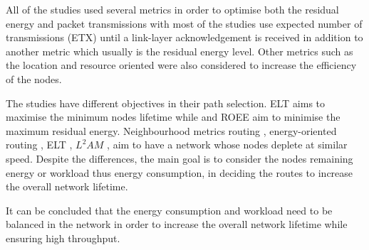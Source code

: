 All of the studies used several metrics in order to optimise both the residual energy and packet transmissions with most of the studies use expected number of transmissions (ETX) until a link-layer acknowledgement is received in addition to another metric which usually is the residual energy level. Other metrics such as the location and resource oriented were also considered to increase the efficiency of the nodes.

The studies have different objectives in their path selection.
ELT \cite{elt} aims to maximise the minimum nodes lifetime while \cite{energyrpl} and ROEE \cite{roee} aim to minimise the maximum residual energy. Neighbourhood metrics routing \cite{spreadload}, energy-oriented routing \cite{loadbalance}, ELT \cite{elt}, $L^{2}AM$ \cite{compositeMetric}, \cite{customOF} aim to have a network whose nodes deplete at similar speed. 
Despite the differences, the main goal is to consider the nodes remaining energy or workload thus energy consumption, in deciding the routes to increase the overall network lifetime. 


It can be concluded that the energy consumption and workload need to be balanced in the network in order to increase the overall network lifetime while ensuring high throughput. 


